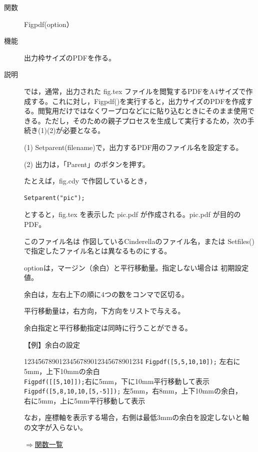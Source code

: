\documentclass[papersize,a4paper,12pt,uplatex]{jsarticle}
\begin{document}
\begin{description}
\vspace{\baselineskip}

\hypertarget{figpdf}{}
\item[関数]Figpdf(option）
\item[機能]出力枠サイズのPDFを作る。
\item[説明]\ketcindy では，通常，出力された fig.tex ファイルを閲覧するPDFをA4サイズで作成する。これに対し，Figpdf()を実行すると，出力サイズのPDFを作成する。閲覧用だけではなくワープロなどにに貼り込むときにそのまま使用できる。ただし，そのための親子プロセスを生成して実行するため，次の手続き(1)(2)が必要となる。

\vspace{\baselineskip}
(1) Setparent(filename)で，出力するPDF用のファイル名を設定する。

(2) 出力は，「Parent」のボタンを押す。

\vspace{\baselineskip}
たとえば，fig.cdy で作図しているとき，
\begin{verbatim}
Setparent("pic");
\end{verbatim}
とすると，fig.tex を表示した pic.pdf が作成される。pic.pdf が目的のPDF。

このファイル名は 作図しているCinderellaのファイル名，または Setfiles() で指定したファイル名とは異なるものにする。

optionは，マージン（余白）と平行移動量。指定しない場合は 初期設定値。

余白は，左右上下の順に4つの数をコンマで区切る。

平行移動量は，右方向，下方向をリストで与える。

余白指定と平行移動指定は同時に行うことができる。

\vspace{\baselineskip}
【例】余白の設定
\begin{tabbing}
1234\=567890123456789012345678901234\=\kill
 \> \verb|Figpdf([5,5,10,10]);|\> 左右に5mm，上下10mmの余白\\
 \> \verb|Figpdf([[5,10]]);|\>右に5mm，下に10mm平行移動して表示\\
 \> \verb|Figpdf([5,8,10,10,[5,-5]]);| \> 左5mm，右8mm，上下10mmの余白，\\
\>\> 右に5mm，上に5mm平行移動して表示
\end{tabbing}

なお，座標軸を表示する場合，右側は最低3mmの余白を設定しないと軸の文字が入らない。

\begin{flushright}\hyperlink{functionlist}{$\Rightarrow$関数一覧}\end{flushright}


\end{description}
\end{document}
